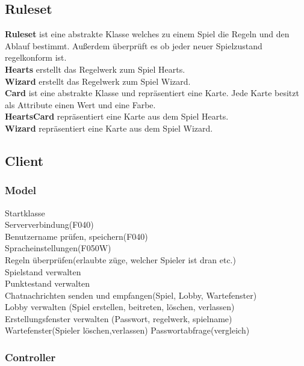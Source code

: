 \documentclass{article}
\begin{document}
	\subsection{Ruleset}
		\textbf{Ruleset} ist eine abstrakte Klasse welches zu einem Spiel die Regeln und den Ablauf bestimmt. Außerdem überprüft es ob jeder neuer Spielzustand regelkonform ist. \\
		\textbf{Hearts} erstellt das Regelwerk zum Spiel Hearts. \\
		\textbf{Wizard} erstellt das Regelwerk zum Spiel Wizard. \\
		\textbf{Card} ist eine abstrakte Klasse und repräsentiert eine Karte. Jede Karte besitzt als Attribute einen Wert und eine Farbe. \\
		\textbf{HeartsCard} repräsentiert eine Karte aus dem Spiel Hearts. \\
		\textbf{Wizard} repräsentiert eine Karte aus dem Spiel Wizard.
	\subsection{Client}
	\subsubsection{Model}
		Startklasse \\
		Serververbindung(F040)\\
		Benutzername prüfen, speichern(F040)\\
		Spracheinstellungen(F050W) \\
		Regeln überprüfen(erlaubte züge, welcher Spieler ist dran etc.)\\
		Spielstand verwalten \\
		Punktestand verwalten\\
		Chatnachrichten senden und empfangen(Spiel, Lobby, Wartefenster) \\
		Lobby	verwalten (Spiel erstellen, beitreten, löschen, verlassen)\\	
		Erstellungsfenster verwalten (Passwort, regelwerk, spielname)\\
		Wartefenster(Spieler löschen,verlassen)
		Passwortabfrage(vergleich)\\
	\subsubsection{Controller}
\end{document}
